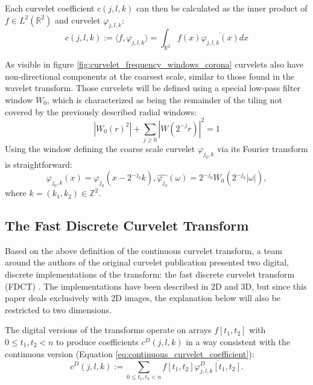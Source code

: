 Each curvelet coefficient $c(j, l, k)$ can then be calculated as the inner
product of $f \in L^2(\mathbb{R}^2)$ and curvelet $\varphi_{j, l, k}$:
\begin{equation} \label{eq:continuous_curvelet_coefficient}
    c(j, l, k) := \langle f, \varphi_{j, l, k} \rangle = \int_{\mathbb{R}^2} f(x) \overline{\varphi_{j, l, k}(x)} dx
\end{equation}

As visible in figure \ref{fig:curvelet_frequency_windows_corona} curvelets also
have non-directional components at the coarsest scale, similar to those found
in the wavelet transform. Those curvelets will be defined using a special
low-pass filter window $W_0$, which is characterized as being the remainder of
the tiling not covered by the previously described radial windows:
\begin{equation*}
    |W_0(r)^2| + \sum_{j \geq 0} |W(2^{-j}r)|^2 = 1
\end{equation*}
Using the window defining the coarse scale curvelet $\varphi_{j_0, k}$ via its
Fourier transform is straightforward:
\begin{equation} \label{eq:continuous_coarse_curvelet}
    \varphi_{j_0, k}(x) = \varphi_{j_0}(x-2^{-j_0}k), \hat{\varphi_{j_0}}(\omega) = 2^{-j_0}W_0(2^{-j_0}|\omega|),
\end{equation}
where $k = (k_1, k_2) \in \mathbb{Z}^2$.

\subsection{The Fast Discrete Curvelet Transform}

Based on the above definition of the continuous curvelet transform, a team
around the authors of the original curvelet publication presented two digital,
discrete implementations of the transform: the fast discrete curvelet transform
(FDCT) \autocite{candes_fast_2006}. The implementations have been described in
2D and 3D, but since this paper deals exclusively with 2D images, the
explanation below will also be restricted to two dimensions.

The digital versions of the transforms operate on arrays $f[t_1, t_2]$ with $0
\leq t_1, t_2 < n$ to produce coefficients $c^D(j, l, k)$ in a way
consistent with the continuous version (Equation
\ref{eq:continuous_curvelet_coefficient}):
\begin{equation}
    c^D(j, l, k) := \sum_{0 \leq t_1, t_2 < n} f[t_1, t_2] \overline{\varphi_{j, l, k}^D[t_1, t_2]}.
\end{equation}

